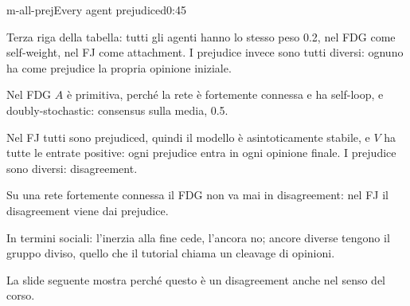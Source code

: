 \begin{slide}{m-all-prej}{Every agent prejudiced}{0:45}
  \begin{discorso}
    \item Terza riga della tabella: tutti gli agenti hanno lo stesso peso 0.2, nel FDG come self-weight, nel FJ come attachment. I prejudice invece sono tutti diversi: ognuno ha come prejudice la propria opinione iniziale.
    \item Nel FDG $A$ è primitiva, perché la rete è fortemente connessa e ha self-loop, e doubly-stochastic: consensus sulla media, 0.5.
    \item Nel FJ tutti sono prejudiced, quindi il modello è asintoticamente stabile, e $V$ ha tutte le entrate positive: ogni prejudice entra in ogni opinione finale. I prejudice sono diversi: disagreement.
    \item Su una rete fortemente connessa il FDG non va mai in disagreement: nel FJ il disagreement viene dai prejudice.
    \item In termini sociali: l'inerzia alla fine cede, l'ancora no; ancore diverse tengono il gruppo diviso, quello che il tutorial chiama un cleavage di opinioni.
    \item La slide seguente mostra perché questo è un disagreement anche nel senso del corso.
  \end{discorso}
\end{slide}

